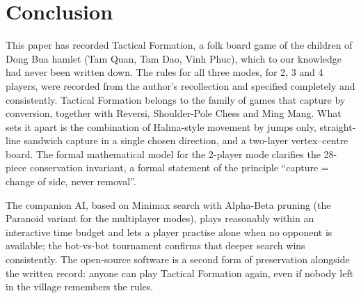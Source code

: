 \section{Conclusion}
\label{sec:conclusion}

This paper has recorded Tactical Formation, a folk board game of the children of Dong
Bua hamlet (Tam Quan, Tam Dao, Vinh Phuc), which to our knowledge had never
been written down. The rules for all three modes, for 2, 3 and 4 players,
were recorded from the author's recollection and specified completely and
consistently. Tactical Formation belongs to the family of games that capture by
conversion, together with Reversi, Shoulder-Pole Chess and Ming Mang. What sets it apart
is the combination of Halma-style movement by jumps only, straight-line
sandwich capture in a single chosen direction, and a two-layer
vertex--centre board. The formal mathematical model for the 2-player mode
clarifies the 28-piece conservation invariant, a formal statement of the principle
``capture = change of side, never removal''.

The companion AI, based on Minimax search with Alpha-Beta pruning (the
Paranoid variant for the multiplayer modes), plays reasonably within an
interactive time budget and lets a player practise alone when no opponent is
available; the bot-vs-bot tournament confirms that deeper search wins
consistently. The open-source software is a second form of preservation
alongside the written record: anyone can play Tactical Formation again, even if nobody
left in the village remembers the rules.


